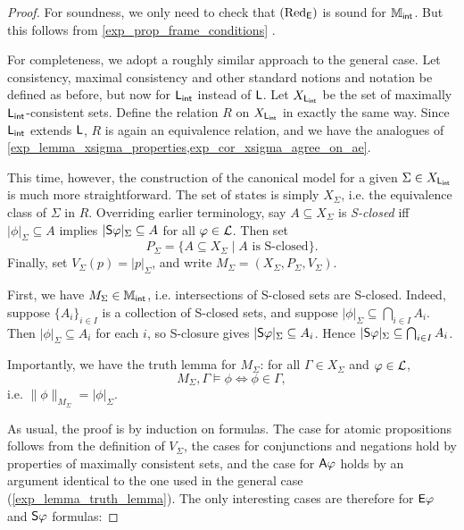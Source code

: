 \begin{proof}
    For soundness, we only need to check that $\redE$ is sound for $\Mint$. But
    this follows from \cref{exp_prop_frame_conditions}
    .

    For completeness, we adopt a roughly
    similar approach to the general case. Let consistency, maximal consistency and
    other standard notions and notation be defined as before, but now for $\sLint$
    instead of $\sL$. Let $X_{\sLint}$ be the set of maximally $\sLint$-consistent
    sets. Define the relation $R$ on $X_{\sLint}$ in exactly the same way. Since
    $\sLint$ extends $\sL$, $R$ is again an equivalence relation, and we have the
    analogues of \cref{exp_lemma_xsigma_properties,exp_cor_xsigma_agree_on_ae}.

    This time, however, the construction of the canonical model for a given
    $\Sigma \in X_{\sLint}$ is much more straightforward. The set of
    states is simply $X_\Sigma$, i.e. the equivalence class of
    $\Sigma$ in $R$. Overriding earlier terminology, say $A
    \subseteq X_\Sigma$ is \emph{S-closed} iff $|\phi|_\Sigma \subseteq A$
    implies $|\S\phi|_\Sigma \subseteq A$ for all $\phi \in \cL$.
    Then set
    \[
        P_\Sigma = \{A \subseteq X_\Sigma \mid A \text{ is S-closed}\}.
    \]
    Finally, set $V_\Sigma(p) = |p|_\Sigma$, and write $M_\Sigma
    = (X_\Sigma, P_\Sigma, V_\Sigma)$.

    First, we have $M_\Sigma \in \Mint$, i.e. intersections of S-closed sets are
    S-closed.  Indeed, suppose $\{A_i\}_{i \in I}$ is a collection of S-closed
    sets, and suppose $|\phi|_\Sigma \subseteq \bigcap_{i \in I}{A_i}$. Then
    $|\phi|_\Sigma \subseteq A_i$ for each $i$, so S-closure gives $|\S\phi|_\Sigma
    \subseteq A_i$.  Hence $|\S\phi|_\Sigma \subseteq \bigcap_{i \in I}{A_i}$.

    Importantly, we have the truth lemma for $M_\Sigma$: for all $\Gamma \in
        X_\Sigma$ and $\phi \in \cL$,
    \[
        M_\Sigma, \Gamma \models \phi \iff \phi \in \Gamma,
    \]
    i.e. $\|\phi\|_{M_\Sigma} = |\phi|_\Sigma$.

    As usual, the proof is by induction on formulas. The case for atomic
    propositions follows from the definition of $V_\Sigma$, the cases for
    conjunctions and negations hold by properties of maximally consistent sets,
    and the case for $\A\phi$ holds by an argument identical to the one used in
    the general case (\cref{exp_lemma_truth_lemma}). The only interesting cases are
    therefore for $\E\phi$ and $\S\phi$ formulas:


\end{proof}
